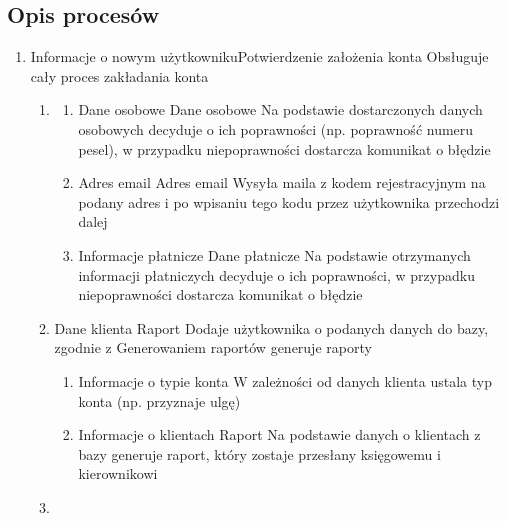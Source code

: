 \documentclass[a4paper,11pt]{article}
\begin{document}
\subsection{Opis procesów}
\begin{enumerate}
    \item {} {Informacje o nowym użytkowniku}{Potwierdzenie założenia konta} {Obsługuje cały proces zakładania konta}
        \begin{enumerate}
            \item {}
                \begin{enumerate}
                    \item {} {Dane osobowe} {Dane osobowe} {Na podstawie dostarczonych danych osobowych decyduje o ich poprawności (np. poprawność numeru pesel), w przypadku niepoprawności dostarcza komunikat o błędzie}
                    \item {} {Adres email} {Adres email} {Wysyła maila z kodem rejestracyjnym na podany adres i po wpisaniu tego kodu przez użytkownika przechodzi dalej}
                    \item {} {Informacje płatnicze} {Dane płatnicze} {Na podstawie otrzymanych informacji płatniczych decyduje o ich poprawności, w przypadku niepoprawności dostarcza komunikat o błędzie}
                \end{enumerate}
            \item {} {Dane klienta} {Raport} {Dodaje użytkownika o podanych danych do bazy, zgodnie z Generowaniem raportów generuje raporty}
                \begin{enumerate}
                    \item {} {Informacje o typie konta} {W zależności od danych klienta ustala typ konta (np. przyznaje ulgę)}
                    \item {} {Informacje o klientach} {Raport} {Na podstawie danych o klientach z bazy generuje raport, który zostaje przesłany księgowemu i kierownikowi}
                \end{enumerate}
            \item {}

\end{enumerate}
\end{enumerate}
\end{document}
